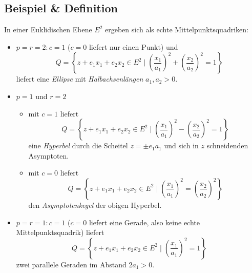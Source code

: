 \subsection{Beispiel \& Definition}
	In einer Euklidischen Ebene $ E^2 $ ergeben sich als echte Mittelpunktsquadriken:
		\begin{itemize}
			\item $ p=r=2 : c=1 $ ($ c=0 $ liefert nur einen Punkt) und
				\[ Q=\left\{z+e_1x_1+e_2x_2\in E^2\mid \left(\frac{x_1}{a_1}\right)^2+\left(\frac{x_2}{a_2}\right)^2 = 1\right\} \]
				liefert eine \emph{Ellipse} mit \emph{Halbachsenlängen} $ a_1,a_2 > 0$.
			\item $ p=1 $ und $ r=2 $
				\begin{itemize}
					\item mit $ c=1 $ liefert
						\[ Q=\left\{z+e_1x_1+e_2x_2\in E^2\mid \left(\frac{x_1}{a_1}\right)^2-\left(\frac{x_2}{a_2}\right)^2 = 1\right\} \]
						eine \emph{Hyperbel} durch die Scheitel $ z=\pm e_1a_1 $ und sich in $ z $ schneidenden Asymptoten.
	        \begin{figure}[h]\centering
     		    
    	    \end{figure}\noindent
   
					\item mit $ c=0 $ liefert
						\[ Q=\left\{z+e_1x_1+e_2x_2\in E^2\mid \left(\frac{x_1}{a_1}\right)^2=\left(\frac{x_2}{a_2}\right)^2 \right\} \]
						den \emph{Asymptotenkegel} der obigen Hyperbel.
				\end{itemize}
			\item $ p=r=1 : c=1 $ ($ c=0 $ liefert eine Gerade, also keine echte Mittelpunktsquadrik) liefert
				\[ Q=\left\{z+e_1x_1+e_2x_2\in E^2\mid \left(\frac{x_1}{a_1}\right)^2 = 1\right\} \]
			zwei parallele Geraden im Abstand $ 2a_1 > 0$.
		\end{itemize}
	